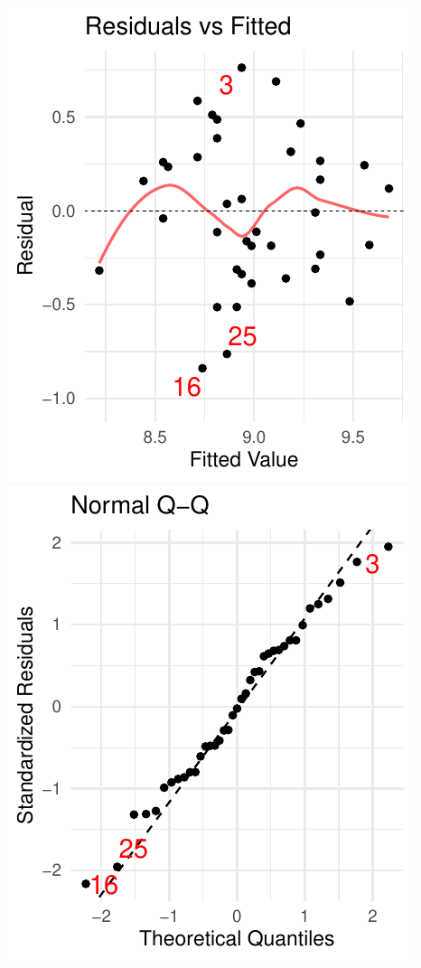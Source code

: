\documentclass[twoside]{book}\usepackage[]{graphicx}\usepackage[]{xcolor}
\makeatletter
\def\maxwidth{ %
  \ifdim\Gin@nat@width>\linewidth
    \linewidth
  \else
    \Gin@nat@width
  \fi
}
\newenvironment{knitrout}{}{} %
\makeatother
\begin{document}
\begin{solution}
\begin{knitrout}
{\centering \includegraphics[width=\maxwidth]{figures/fig-unnamed-chunk-226-1} 
\includegraphics[width=\maxwidth]{figures/fig-unnamed-chunk-226-2} 

}
\end{knitrout}
\end{solution}
\end{document}

